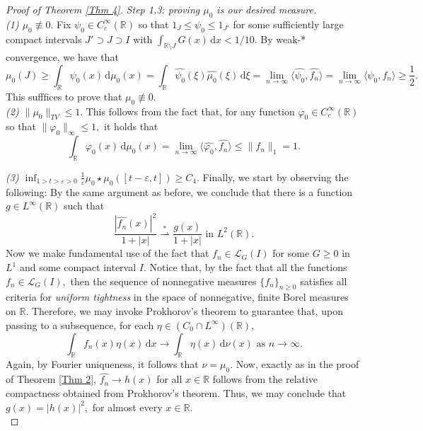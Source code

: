 \documentclass[11pt, reqno]{amsart}
\newcommand{\mmd}{ \mathrm{d}}
\numberwithin{equation}{section}
\newcommand{\R}{{\mathbb R}}
\newcommand{\eps}{{\varepsilon}}
\begin{document}
\begin{proof}[Proof of Theorem \ref{Thm 4}]
\noindent\textit{Step 1.3: proving $\mu_0$ is our desired measure.} \\

\noindent\textit{(1) $\mu_0 \not\equiv 0.$} Fix $\psi_0 \in C^{\infty}_c(\R)$ so that $1_{J} \le \psi_0 \le 1_{J'}$ for some sufficiently large compact intervals $J' \supset J \supset I$ with $\int_{\R \setminus J} G(x) \, \mmd x < 1/10.$ By weak-* convergence, we have that 
\[
\mu_0(J) \ge \int_{\R} \psi_0(x) \, \mmd \mu_0(x) = \int_{\R} \widehat{\psi_0}(\xi) \widehat{\mu_0}(\xi) \, \mmd \xi = \lim_{n \to \infty} \langle \widehat{\psi_0}, \widehat{f_n} \rangle = \lim_{n \to \infty} \langle \psi_0, f_n \rangle \ge \frac{1}{2}.
\]
This sufffices to prove that $\mu_0 \not\equiv 0.$ \\

\noindent\textit{(2) $\|\mu_0\|_{TV} \le 1.$} This follows from the fact that, for any function $\varphi_0 \in C^{\infty}_c(\R)$ so that $\|\varphi_0\|_{\infty}\le 1,$ it holds that 
\[
\int_{\R} \varphi_0(x) \, \mmd \mu_0(x) = \lim_{n \to \infty} \langle \widehat{\varphi_0}, \widehat{f_n} \rangle \le \|f_n\|_1 = 1. 
\]

\noindent\textit{(3) $\inf_{1 > t > \eps > 0} \frac{1}{\eps} \mu_0 \star \mu_0([t-\eps,t]) \ge C_4.$} Finally, we start by observing the following: 
By the same argument as before, we conclude that there is a function $g \in L^{\infty}(\R)$ such that 
\[
\frac{|\widehat{f_n}(x)|^2}{1+|x|} \overset{\ast}{\rightharpoonup} \frac{g(x)}{1+|x|} \text{ in } L^2(\R).
\]
Now we make fundamental use of the fact that $f_n \in \mathcal{L}_G(I)$ for some $G \ge 0$ in $L^1$ and some compact interval $I.$ Notice that, by the fact that all the functions 
$f_n \in \mathcal{L}_G(I),$ then the sequence of nonnegative measures $\{f_n\}_{n \ge 0}$ satisfies all criteria for \emph{uniform tightness} in the space of nonnegative, finite Borel measures on $\R.$ Therefore, 
we may invoke Prokhorov's theorem to guarantee that, upon passing to a subsequence, for each $\eta \in (C_0 \cap L^{\infty}) (\R),$
\[
\int_{\R} f_n(x) \eta(x) \, \mmd x \to \int_{\R} \eta(x) \, \mmd \nu(x) \text{ as } n \to \infty.
\]
Again, by Fourier uniqueness, it follows that $\nu = \mu_0.$ Now, exactly as in the proof of Theorem \ref{Thm 2}, $\widehat{f_n} \to h(x)$ for all $x \in \R$ follows from 
the relative compactness obtained from Prokhorov's theorem. Thus, we may conclude that $g(x) = |h(x)|^2,$ for almost every $x \in \R.$ \\


\end{proof}
\end{document}
